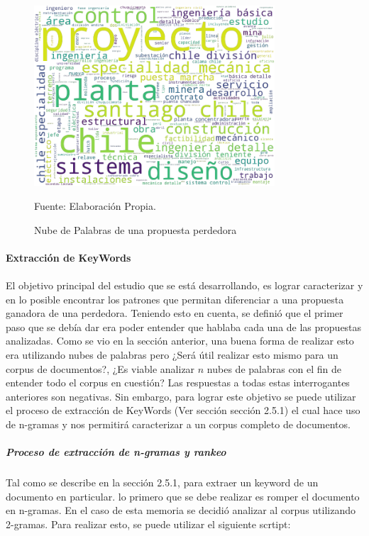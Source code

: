 \begin{figure}[H]
\centering
\includegraphics[width=0.8\textwidth]{figures/KeyWords/nube_perdedora.png}
\caption{\label{fig:nube_perdedora} Nube de Palabras de una propuesta perdedora} Fuente: Elaboración Propia.
\end{figure}

\paragraph{Extracción de KeyWords}
\paragraph*{}
    El objetivo principal del estudio que se está desarrollando, es lograr caracterizar y en lo posible encontrar los patrones que permitan diferenciar a una propuesta ganadora de una perdedora. Teniendo esto en cuenta, se definió que el primer paso que se debía dar era poder entender que hablaba cada una de las propuestas analizadas. Como se vio en la sección anterior, una buena forma de realizar esto era utilizando nubes de palabras pero ¿Será útil realizar esto mismo para un corpus de documentos?, ¿Es viable analizar $n$ nubes de palabras con el fin de entender todo el corpus en cuestión? Las respuestas a todas estas interrogantes anteriores son negativas. Sin embargo, para lograr este objetivo se puede utilizar el proceso de extracción de KeyWords (Ver sección sección 2.5.1) el cual hace uso de n-gramas y nos permitirá caracterizar a un corpus completo de documentos.

\subparagraph{Proceso de extracción de n-gramas y rankeo}
\subparagraph*{}
    Tal como se describe en la sección 2.5.1, para extraer un keyword de un documento en particular. lo primero que se debe realizar es romper el documento en n-gramas. En el caso de esta memoria se decidió analizar al corpus utilizando 2-gramas. Para realizar esto, se puede utilizar el siguiente scrtipt:

